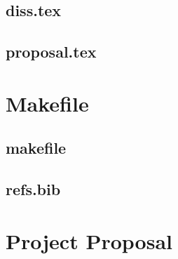 \documentclass[12pt,a4paper,twoside,openright]{report}
\begin{document}
\section{diss.tex}
{\scriptsize}

\section{proposal.tex}
{\scriptsize}

\chapter{Makefile}

\section{makefile}\label{makefile}
{\scriptsize}

\section{refs.bib}
{\scriptsize}


\chapter{Project Proposal}


\end{document}
